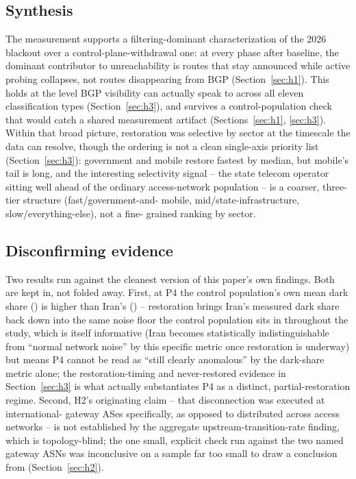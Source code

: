 \subsection{Synthesis}

The measurement supports a filtering-dominant characterization of the
2026 blackout over a control-plane-withdrawal one: at every phase after
baseline, the dominant contributor to unreachability is routes that stay
announced while active probing collapses, not routes disappearing from BGP
(Section~\ref{sec:h1}). This holds at the level BGP visibility can actually
speak to across all eleven classification types (Section~\ref{sec:h3}), and
survives a control-population check that would catch a shared measurement
artifact (Sections~\ref{sec:h1}, \ref{sec:h3}). Within that broad picture,
restoration was selective by sector at the timescale the data can resolve,
though the ordering is not a clean single-axis priority list
(Section~\ref{sec:h3}): government and mobile restore fastest by median, but
mobile's tail is long, and the interesting selectivity signal -- the
state telecom operator sitting well ahead of the ordinary access-network
population -- is a coarser, three-tier structure (fast/government-and-
mobile, mid/state-infrastructure, slow/everything-else), not a fine-
grained ranking by sector.

\subsection{Disconfirming evidence}

Two results run against the cleanest version of this paper's own findings.
Both are kept in, not folded away. First, at P4 the control population's
own mean dark share (\controlDarkSharePFour{}) is higher than Iran's
(\darkSharePFour{}) -- restoration brings Iran's measured dark share back
down into the same noise floor the control population sits in throughout
the study, which is itself informative (Iran becomes statistically
indistinguishable from ``normal network noise'' by this specific metric
once restoration is underway) but means P4 cannot be read as ``still
clearly anomalous'' by the dark-share metric alone; the restoration-timing
and never-restored evidence in Section~\ref{sec:h3} is what actually
substantiates P4 as a distinct, partial-restoration regime. Second, H2's
originating claim -- that disconnection was executed at international-
gateway ASes specifically, as opposed to distributed across access networks
-- is not established by the aggregate upstream-transition-rate finding,
which is topology-blind; the one small, explicit check run against the two
named gateway ASNs was inconclusive on a sample far too small to draw a
conclusion from (Section~\ref{sec:h2}).

